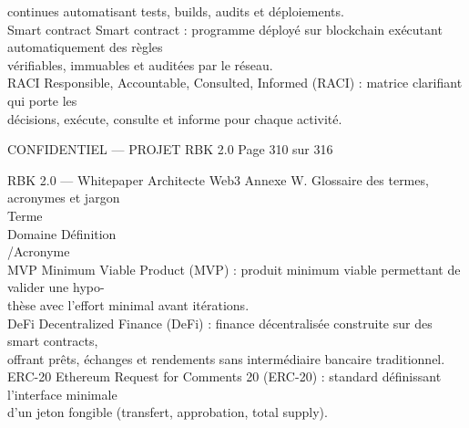 continues automatisant tests, builds, audits et déploiements.\\
\vspace{0.5em}
Smart contract                          Smart contract : programme déployé sur blockchain exécutant automatiquement des règles\\
vérifiables, immuables et auditées par le réseau.\\
\vspace{0.5em}
RACI                                    Responsible, Accountable, Consulted, Informed (RACI) : matrice clarifiant qui porte les\\
décisions, exécute, consulte et informe pour chaque activité.\\
\vspace{0.5em}
\vspace{0.5em}
\vspace{0.5em}
\vspace{0.5em}
\begin{confidential}CONFIDENTIEL — PROJET RBK 2.0                    Page 310 sur 316\end{confidential}
RBK 2.0 — Whitepaper Architecte Web3                                                  Annexe W. Glossaire des termes, acronymes et jargon\\
\vspace{0.5em}
\vspace{0.5em}
Terme\\
Domaine    Définition\\
/Acronyme\\
MVP                                         Minimum Viable Product (MVP) : produit minimum viable permettant de valider une hypo-\\
thèse avec l’effort minimal avant itérations.\\
\vspace{0.5em}
DeFi                                        Decentralized Finance (DeFi) : finance décentralisée construite sur des smart contracts,\\
offrant prêts, échanges et rendements sans intermédiaire bancaire traditionnel.\\
\vspace{0.5em}
ERC-20                                      Ethereum Request for Comments 20 (ERC-20) : standard définissant l’interface minimale\\
d’un jeton fongible (transfert, approbation, total supply).\\
\vspace{0.5em}
